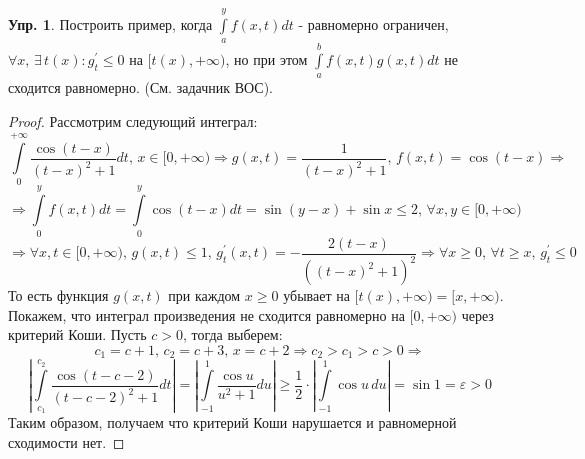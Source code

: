 \documentclass[12pt]{article}
\newcommand{\VE}{\varepsilon}
\theoremstyle{definition}
\newtheorem{exrc}{Упр.}
\newcommand{\ddint}[2]{\displaystyle\int\limits_{#1}^{#2}}
\begin{document}
\begin{exrc}
	Построить пример, когда $\ddint{a}{y}f(x,t)dt$ - равномерно ограничен, $\forall x, \, \exists \, t(x) \colon g_t^\prime \leq 0$ на $[t(x), + \infty)$, но при этом $\ddint{a}{b}f(x,t)g(x,t)dt$ не сходится равномерно. (См. задачник ВОС).
\end{exrc}
\begin{proof}
	Рассмотрим следующий интеграл:
	$$
 		\ddint{0}{+\infty}\dfrac{\cos{(t - x)}}{(t-x)^2 + 1}dt, \, x \in [0,+\infty) \Rightarrow g(x,t) = \dfrac{1}{(t-x)^2 + 1}, \, f(x,t) = \cos{(t-x)} \Rightarrow
	$$
	$$
		\Rightarrow \ddint{0}{y}f(x,t)dt = \ddint{0}{y}\cos{(t-x)}dt = \sin{(y - x)} + \sin{x} \leq 2, \, \forall x,y \in [0, +\infty)
	$$
	$$
		\Rightarrow \forall x,t \in [0, +\infty), \, g(x,t) \leq 1, \, g_t^\prime(x,t) = -\dfrac{2(t-x)}{\left((t-x)^2 + 1\right)^2} \Rightarrow \forall x \geq 0, \, \forall t \geq x, \, g_t^\prime \leq 0
	$$
	То есть функция $g(x,t)$ при каждом $x \geq 0$ убывает на $[t(x),+\infty) = [x, + \infty)$. Покажем, что интеграл произведения не сходится равномерно на $[0,+\infty)$ через критерий Коши. Пусть $c > 0$, тогда выберем:
	$$
		c_1 = c + 1, \, c_2 = c + 3, \, x = c + 2 \Rightarrow c_2 > c_1 > c > 0 \Rightarrow
	$$
	$$
		\left|\ddint{c_1}{c_2}\dfrac{\cos{(t- c - 2)}}{(t - c - 2)^2 + 1}dt\right| = \left|\ddint{-1}{1}\dfrac{\cos{u}}{u^2 +1 }du\right| \geq \dfrac{1}{2}{\cdot}\left|\ddint{-1}{1}\cos{u} \, du\right| = \sin{1} = \VE > 0
	$$
	Таким образом, получаем что критерий Коши нарушается и равномерной сходимости нет.
\end{proof}
\end{document}
